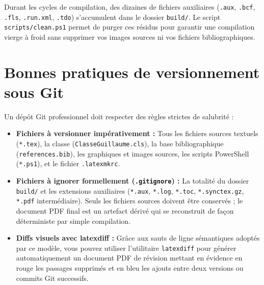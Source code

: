 Durant les cycles de compilation, des dizaines de fichiers auxiliaires (\texttt{.aux}, \texttt{.bcf}, \texttt{.fls}, \texttt{.run.xml}, \texttt{.tdo}) s'accumulent dans le dossier \texttt{build/}.
Le script \texttt{scripts/clean.ps1} permet de purger ces résidus pour garantir une compilation vierge à froid sans supprimer vos images sources ni vos fichiers bibliographiques.

\section{Bonnes pratiques de versionnement sous Git}
\label{sec:bonnes_pratiques_git}

Un dépôt Git professionnel doit respecter des règles strictes de salubrité :
\begin{itemize}
  \item \textbf{Fichiers à versionner impérativement :}
  Tous les fichiers sources textuels (\texttt{*.tex}), la classe (\texttt{ClasseGuillaume.cls}),
  la base bibliographique (\texttt{references.bib}), les graphiques et images sources,
  les scripts PowerShell (\texttt{*.ps1}), et le fichier \texttt{.latexmkrc}.
  
  \item \textbf{Fichiers à ignorer formellement (\texttt{.gitignore}) :}
  La totalité du dossier \texttt{build/} et les extensions auxiliaires (\texttt{*.aux}, \texttt{*.log}, \texttt{*.toc}, \texttt{*.synctex.gz}, \texttt{*.pdf} intermédiaire).
  Seuls les fichiers sources doivent être conservés ; le document PDF final est un artefact dérivé qui se reconstruit de façon déterministe par simple compilation.

  \item \textbf{Diffs visuels avec \textsf{latexdiff} :}
  Grâce aux sauts de ligne sémantiques adoptés par ce modèle, vous pouvez utiliser l'utilitaire \texttt{latexdiff} pour générer automatiquement un document PDF de révision mettant en évidence en rouge les passages supprimés et en bleu les ajouts entre deux versions ou commits Git successifs.
\end{itemize}

